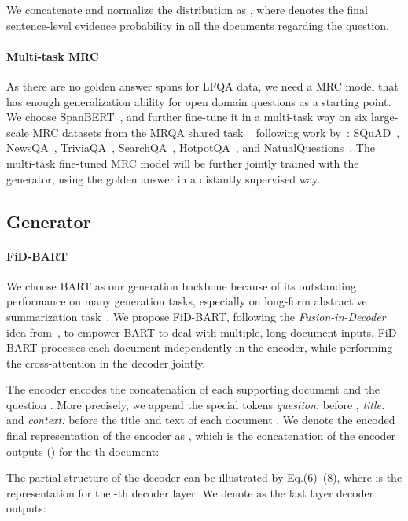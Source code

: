 \documentclass[11pt]{article}
\begin{document}
We concatenate  and normalize the distribution as , where  denotes the final sentence-level evidence probability in all the  documents regarding the question. 


\paragraph{Multi-task MRC}
As there are no golden answer spans for LFQA data, we need a MRC model that has enough generalization ability for open domain questions as a starting point. We choose SpanBERT~\cite{joshi2020spanbert}, and further fine-tune it in a multi-task way on six large-scale MRC datasets from the MRQA shared task ~\cite{fisch-etal-2019-mrqa} following work by~\citet{su-etal-2019-generalizing}: SQuAD~\cite{rajpurkar2016squad}, NewsQA~\cite{trischler2017newsqa}, TriviaQA~\cite{Joshi_2017}, SearchQA~\cite{dunn2017searchqa}, HotpotQA~\cite{yang2018HotpotQA}, and NatualQuestions~\cite{kwiatkowski2019natural}. The multi-task fine-tuned MRC model  will be further jointly trained with the generator, using the golden answer in a distantly supervised way.

\vspace{-5pt}
\subsection{Generator}

\paragraph{FiD-BART} We choose BART as our generation backbone because of its outstanding performance on many generation tasks, especially on long-form abstractive summarization task~\cite{lewis2020bart}. We propose FiD-BART, following the \textit{Fusion-in-Decoder} idea from~\citet{izacard2021leveraging}, to empower BART to deal with multiple, long-document inputs. FiD-BART processes each document independently in the encoder, while performing the cross-attention in the decoder jointly. 

The encoder encodes the concatenation of each supporting document  and the question . More precisely, we append the special tokens \textit{question:} before , \textit{title:} and \textit{context:} before the title and text of each document . We denote the encoded final representation of the encoder as ,  which is the concatenation of the  encoder outputs  () for the th document:


The partial structure of the decoder can be illustrated by Eq.(6)--(8), where  is the representation for the -th decoder layer. We denote  as the last layer decoder outputs: 
\vspace{-3pt}
\end{document}
